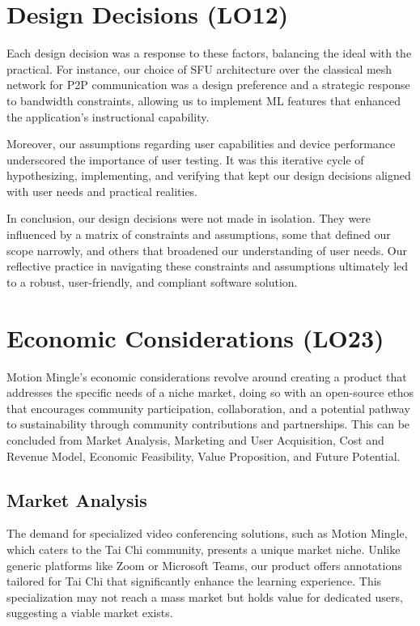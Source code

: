 \documentclass{article}
\begin{document}
\section{Design Decisions (LO12)}
Each design decision was a response to these factors, balancing the ideal with the practical. 
For instance, our choice of SFU architecture over the classical mesh network for P2P communication was a design preference and a strategic response to bandwidth constraints, allowing us to implement ML features that enhanced the application's instructional capability.

Moreover, our assumptions regarding user capabilities and device performance underscored the importance of user testing. 
It was this iterative cycle of hypothesizing, implementing, and verifying that kept our design decisions aligned with user needs and practical realities.

In conclusion, our design decisions were not made in isolation. They were influenced by a matrix of constraints and assumptions, some that defined our scope narrowly, and others that broadened our understanding of user needs. 
Our reflective practice in navigating these constraints and assumptions ultimately led to a robust, user-friendly, and compliant software solution.

\section{Economic Considerations (LO23)}
Motion Mingle's economic considerations revolve around creating a product that addresses the specific needs of a niche market, doing so with an open-source ethos that encourages community participation, collaboration, and a potential pathway to sustainability through community contributions and partnerships.
This can be concluded from Market Analysis, Marketing and User Acquisition, Cost and Revenue Model, Economic Feasibility, Value Proposition, and Future Potential. 
\subsection{Market Analysis}
The demand for specialized video conferencing solutions, such as Motion Mingle, which caters to the Tai Chi community, presents a unique market niche. 
Unlike generic platforms like Zoom or Microsoft Teams, our product offers annotations tailored for Tai Chi that significantly enhance the learning experience. 
This specialization may not reach a mass market but holds value for dedicated users, suggesting a viable market exists.
\end{document}
